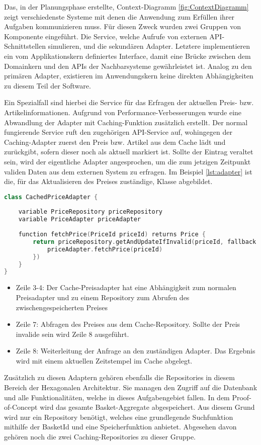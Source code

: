 Das, in der Planungsphase erstellte, Context-Diagramm \ref{fig:ContextDiagramm} zeigt verschiedenste Systeme mit denen die Anwendung zum Erfüllen ihrer Aufgaben kommunizieren muss. Für diesen Zweck wurden zwei Gruppen von Komponente eingeführt. Die Service, welche Aufrufe von externen API-Schnittstellen simulieren, und die sekundären Adapter. Letztere implementieren ein vom Applikationskern definiertes Interface, damit eine Brücke zwischen dem Domainkern und den APIs der Nachbarsysteme gewährleistet ist. Analog zu den primären Adapter, existieren im Anwendungskern keine direkten Abhängigkeiten zu diesem Teil der Software.

Ein Spezialfall sind hierbei die Service für das Erfragen der aktuellen Preis- bzw. Artikelinformationen. Aufgrund von Performance-Verbesserungen wurde eine Abwandlung der Adapter mit Caching-Funktion zusätzlich erstellt. Der normal fungierende Service ruft den zugehörigen API-Service auf, wohingegen der Caching-Adapter zuerst den Preis bzw. Artikel aus dem Cache lädt und zurückgibt, sofern dieser noch als aktuell markiert ist. Sollte der Eintrag veraltet sein, wird der eigentliche Adapter angesprochen, um die zum jetzigen Zeitpunkt validen Daten aus dem externen System zu erfragen. Im Beispiel \ref{lst:adapter} ist die, für das Aktualisieren des Preises zuständige, Klasse  abgebildet.

\begin{minipage}{\linewidth} %
	\begin{lstlisting}[caption={Preisadapter mit Caching-Funktion}, label={lst:adapter}, language=Kotlin]
class CachedPriceAdapter {
	
	variable PriceRepository priceRepository 
	variable PriceAdapter priceAdapter
	
	function fetchPrice(PriceId priceId) returns Price {
		return priceRepository.getAndUpdateIfInvalid(priceId, fallback = {
			priceAdapter.fetchPrice(priceId)
		})
	}
}
	\end{lstlisting}
\end{minipage}

\begin{itemize}[noitemsep,nolistsep]
	\item Zeile 3-4: Der Cache-Preisadapter hat eine Abhängigkeit zum normalen Preisadapter und zu einem Repository zum Abrufen des zwischengespeicherten Preises
	\item Zeile 7: Abfragen des Preises aus dem Cache-Repository. Sollte der Preis invalide sein wird Zeile 8 ausgeführt.
	\item Zeile 8: Weiterleitung der Anfrage an den zuständigen Adapter. Das Ergebnis wird mit einem aktuellen Zeitstempel im Cache abgelegt.
\end{itemize}

Zusätzlich zu diesen Adaptern gehören ebenfalls die Repositories in diesem Bereich der Hexagonalen Architektur. Sie managen den Zugriff auf die Datenbank und alle Funktionalitäten, welche in dieses Aufgabengebiet fallen. In dem Proof-of-Concept wird das gesamte Basket-Aggregate abgespeichert. Aus diesem Grund wird nur ein Repository benötigt, welches eine grundlegende Suchfunktion mithilfe der BasketId und eine Speicherfunktion anbietet. Abgesehen davon gehören noch die zwei Caching-Repositories zu dieser Gruppe. 